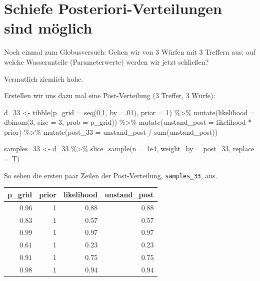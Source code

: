 \documentclass[
  a4paper,
  DIV=11]{scrreprt}
\newenvironment{Shaded}{\begin{snugshade}}{\end{snugshade}}
\newcommand{\AttributeTok}[1]{\textcolor[rgb]{0.40,0.45,0.13}{#1}}
\newcommand{\DecValTok}[1]{\textcolor[rgb]{0.68,0.00,0.00}{#1}}
\newcommand{\FloatTok}[1]{\textcolor[rgb]{0.68,0.00,0.00}{#1}}
\newcommand{\FunctionTok}[1]{\textcolor[rgb]{0.28,0.35,0.67}{#1}}
\newcommand{\NormalTok}[1]{\textcolor[rgb]{0.00,0.23,0.31}{#1}}
\newcommand{\OtherTok}[1]{\textcolor[rgb]{0.00,0.23,0.31}{#1}}
\newcommand{\SpecialCharTok}[1]{\textcolor[rgb]{0.37,0.37,0.37}{#1}}
\theoremstyle{definition}
\theoremstyle{remark}
\begin{document}
\hypertarget{schiefe-posteriori-verteilungen-sind-muxf6glich}{%
\section{Schiefe Posteriori-Verteilungen sind
möglich}\label{schiefe-posteriori-verteilungen-sind-muxf6glich}}

Noch einmal zum Globusversuch: Gehen wir von 3 Würfen mit 3 Treffern
aus; auf welche Wasseranteile (Parameterwerte) werden wir jetzt
schließen?

Vermutlich ziemlich hohe.

Erstellen wir uns dazu mal eine Post-Verteilung (3 Treffer, 3 Würfe):

\begin{Shaded}
\begin{Highlighting}[]
\NormalTok{d\_33 }\OtherTok{\textless{}{-}} 
  \FunctionTok{tibble}\NormalTok{(}\AttributeTok{p\_grid =} \FunctionTok{seq}\NormalTok{(}\DecValTok{0}\NormalTok{,}\DecValTok{1}\NormalTok{, }\AttributeTok{by =}\NormalTok{.}\DecValTok{01}\NormalTok{),}
         \AttributeTok{prior =} \DecValTok{1}\NormalTok{) }\SpecialCharTok{\%\textgreater{}\%} 
  \FunctionTok{mutate}\NormalTok{(}\AttributeTok{likelihood =} \FunctionTok{dbinom}\NormalTok{(}\DecValTok{3}\NormalTok{, }\AttributeTok{size =} \DecValTok{3}\NormalTok{, }\AttributeTok{prob =}\NormalTok{ p\_grid)) }\SpecialCharTok{\%\textgreater{}\%} 
  \FunctionTok{mutate}\NormalTok{(}\AttributeTok{unstand\_post =}\NormalTok{ likelihood }\SpecialCharTok{*}\NormalTok{ prior) }\SpecialCharTok{\%\textgreater{}\%} 
  \FunctionTok{mutate}\NormalTok{(}\AttributeTok{post\_33  =}\NormalTok{ unstand\_post }\SpecialCharTok{/} \FunctionTok{sum}\NormalTok{(unstand\_post)) }

\NormalTok{samples\_33 }\OtherTok{\textless{}{-}} 
\NormalTok{  d\_33 }\SpecialCharTok{\%\textgreater{}\%} 
    \FunctionTok{slice\_sample}\NormalTok{(}\AttributeTok{n =} \FloatTok{1e4}\NormalTok{, }
                 \AttributeTok{weight\_by =}\NormalTok{ post\_33, }
                 \AttributeTok{replace =}\NormalTok{ T)}
\end{Highlighting}
\end{Shaded}

So sehen die ersten paar Zeilen der Post-Verteilung,
\texttt{samples\_33}, aus.

\begin{longtable}{rrrr}
\toprule
p\_grid & prior & likelihood & unstand\_post \\ 
\midrule
$0.96$ & 1 & $0.88$ & $0.88$ \\ 
$0.83$ & 1 & $0.57$ & $0.57$ \\ 
$0.99$ & 1 & $0.97$ & $0.97$ \\ 
$0.61$ & 1 & $0.23$ & $0.23$ \\ 
$0.91$ & 1 & $0.75$ & $0.75$ \\ 
$0.98$ & 1 & $0.94$ & $0.94$ \\ 
\bottomrule
\end{longtable}
\end{document}
